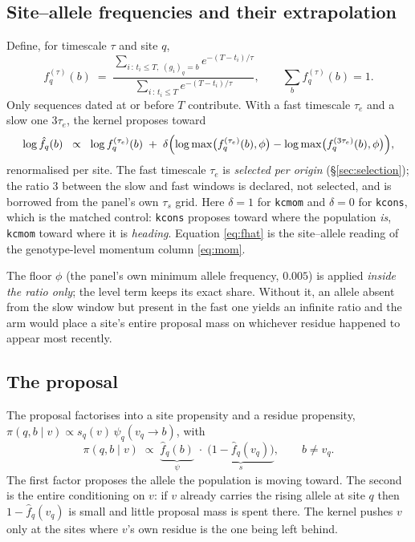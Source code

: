 \documentclass[11pt]{article}
\theoremstyle{remark}
\newcommand{\1}{\mathbf{1}}
\begin{document}
\subsection{Site--allele frequencies and their extrapolation}

Define, for timescale $\tau$ and site $q$,
\begin{equation}
  f^{(\tau)}_q(b) \;=\;
  \frac{\sum_{i\,:\, t_i \le T,\; (g_i)_q = b} e^{-(T-t_i)/\tau}}
       {\sum_{i\,:\, t_i \le T} e^{-(T-t_i)/\tau}},
  \qquad \sum_{b} f^{(\tau)}_q(b) = 1 .
  \label{eq:saf}
\end{equation}
Only sequences dated at or before $T$ contribute. With a fast timescale $\tau_e$ and a
slow one $3\tau_e$, the kernel proposes toward
\begin{equation}
  \log \hat f_q(b) \;\;\propto\;\;
  \log f^{(\tau_e)}_q(b) \;+\; \delta\Bigl(
  \log \max\bigl(f^{(\tau_e)}_q(b), \phi\bigr) -
  \log \max\bigl(f^{(3\tau_e)}_q(b), \phi\bigr)\Bigr),
  \label{eq:fhat}
\end{equation}
renormalised per site. The fast timescale $\tau_e$ is \emph{selected per origin}
(\S\ref{sec:selection}); the ratio $3$ between the slow and fast windows is declared, not
selected, and is borrowed from the panel's own $\tau_s$ grid. Here $\delta = 1$ for
\texttt{kcmom} and $\delta = 0$ for \texttt{kcons}, which is the matched control: \texttt{kcons} proposes toward where the
population \emph{is}, \texttt{kcmom} toward where it is \emph{heading}. Equation
\eqref{eq:fhat} is the site--allele reading of the genotype-level momentum column
\eqref{eq:mom}.

The floor $\phi$ (the panel's own minimum allele frequency, $0.005$) is applied
\emph{inside the ratio only}; the level term keeps its exact share. Without it, an allele
absent from the slow window but present in the fast one yields an infinite ratio and the
arm would place a site's entire proposal mass on whichever residue happened to appear most
recently.

\subsection{The proposal}

The proposal factorises into a site propensity and a residue propensity,
$\pi(q,b \mid v) \propto s_q(v)\,\psi_q(v_q \to b)$, with
\begin{equation}
  \boxed{\;
  \pi(q,b \mid v) \;\propto\;
  \underbrace{\hat f_q(b)}_{\psi}\;\cdot\;
  \underbrace{\bigl(1 - \hat f_q(v_q)\bigr)}_{s},
  \qquad b \neq v_q .
  \;}
  \label{eq:prop}
\end{equation}
The first factor proposes the allele the population is moving toward. The second is the
entire conditioning on $v$: if $v$ already carries the rising allele at site $q$ then
$1 - \hat f_q(v_q)$ is small and little proposal mass is spent there. The kernel pushes
$v$ only at the sites where $v$'s own residue is the one being left behind.
\end{document}
